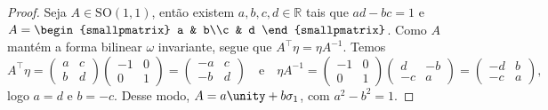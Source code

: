 \begin{proof}
    Seja \(A \in \mathrm{SO}(1,1)\), então existem \(a,b,c,d \in \mathbb{R}\) tais que \(ad - bc = 1\) e \(A = \begin{smallpmatrix} a & b\\c & d \end{smallpmatrix}\). Como \(A\) mantém a forma bilinear \(\omega\) invariante, segue que \(A^\intercal \eta = \eta A^{-1}\). Temos
    \begin{equation*}
        A^\intercal \eta =
        \begin{pmatrix}
            a & c\\
            b & d
        \end{pmatrix}
        \begin{pmatrix}
            -1 & 0\\
            0 & 1
        \end{pmatrix} =
        \begin{pmatrix}
            -a & c\\
            -b & d
        \end{pmatrix}
        \quad\text{e}\quad
        \eta A^{-1}=
        \begin{pmatrix}
            -1 & 0\\
            0 & 1
        \end{pmatrix}
        \begin{pmatrix}
            d & -b\\
            -c & a
        \end{pmatrix}
        =
        \begin{pmatrix}
            -d & b\\
            -c & a
        \end{pmatrix},
    \end{equation*}
    logo \(a = d\) e \(b = -c\). Desse modo, \(A = a \unity + b \sigma_1\), com \(a^2 - b^2 = 1\).
\end{proof}

